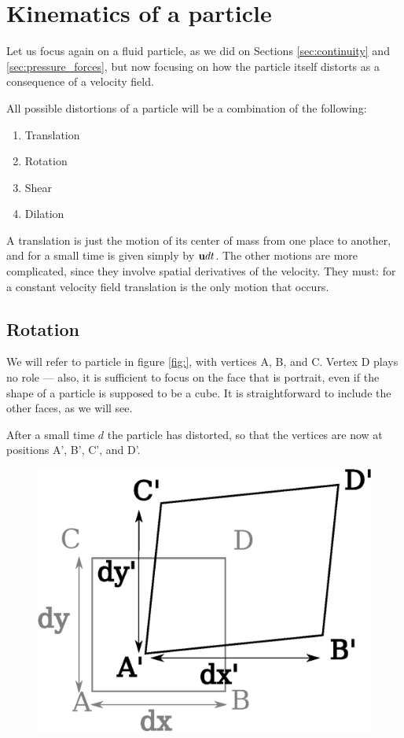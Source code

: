 \section{Kinematics of a particle}

\label{sec:particle}

Let us focus again on a fluid particle, as we did on Sections
\ref{sec:continuity} and \ref{sec:pressure_forces}, but now focusing
on how the particle itself distorts as a consequence of a velocity
field.

All possible distortions of a particle will be a combination of the
following:
\begin{enumerate}
 \item Translation
 \item Rotation
 \item Shear
 \item Dilation
\end{enumerate}

A translation is just the motion of its center of mass from one place
to another, and for a small time is given simply by $\mathbf{u} dt$. The
other motions are more complicated, since they involve spatial
derivatives of the velocity. They must: for a constant velocity field
translation is the only motion that occurs.

\subsection{Rotation}

We will refer to particle in figure \ref{fig:}, with vertices A, B,
and C. Vertex D plays no role --- also, it is sufficient to focus on
the face that is portrait, even if the shape of a particle is supposed
to be a cube. It is straightforward to include the other faces, as we
will see.

After a small time $d$ the particle has distorted, so that the
vertices are now at positions A', B', C', and D'.

\begin{figure}
  \centering
  \includegraphics[width=0.4\linewidth]{figures/particle0}
  \caption{\label{fig:particle0}}
\end{figure}



